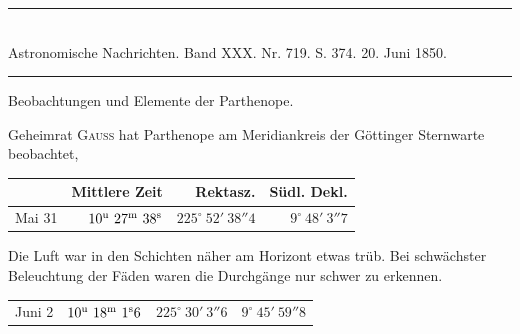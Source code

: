 \clearpage
\hypertarget{native-483-parthenope}{}
\begin{center}
\rule{0.55\linewidth}{0.4pt}\\[2pt]
Astronomische Nachrichten. Band XXX. Nr. 719. S. 374. 20. Juni 1850.\\[2pt]
\rule{0.55\linewidth}{0.4pt}
\end{center}
\begin{center}Beobachtungen und Elemente der Parthenope.\end{center}

Geheimrat \textsc{Gauss} hat Parthenope am Meridiankreis der Göttinger Sternwarte beobachtet,

\begin{center}
\setlength{\tabcolsep}{4pt}
\begin{tabular}{l|r|r|r}
 & Mittlere Zeit & Rektasz. & Südl. Dekl. \\\hline
Mai 31 & $10^{\rm u}\ 27^{\rm m}\ 38^{\rm s}$ & $225^\circ\ 52'\ 38''4$ & $9^\circ\ 48'\ 3''7$ \\
\end{tabular}
\end{center}

Die Luft war in den Schichten näher am Horizont etwas trüb. Bei schwächster Beleuchtung der Fäden waren die Durchgänge nur schwer zu erkennen.

\begin{center}
\setlength{\tabcolsep}{4pt}
\begin{tabular}{l|r|r|r}
Juni 2 & $10^{\rm u}\ 18^{\rm m}\ 1^{\rm s}6$ & $225^\circ\ 30'\ 3''6$ & $9^\circ\ 45'\ 59''8$ \\
\end{tabular}
\end{center}

